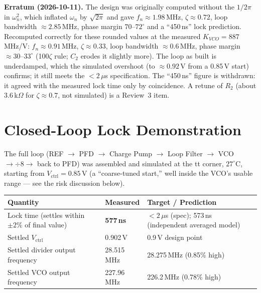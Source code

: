 \documentclass[11pt]{article}
\begin{document}
\medskip
\noindent\textbf{Erratum (2026-10-11).} The design was originally computed without the $1/2\pi$ in $\omega_n^2$, which inflated $\omega_n$ by $\sqrt{2\pi}$ and gave $f_n \approx 1.98$\,MHz, $\zeta \approx 0.72$, loop bandwidth $\approx 2.85$\,MHz, phase margin $70$--$72^\circ$ and a ``450\,ns'' lock prediction. Recomputed correctly for these rounded values at the measured $K_{VCO} = 887$\,MHz/V: $f_n \approx 0.91$\,MHz, $\zeta \approx 0.33$, loop bandwidth $\approx 0.6$\,MHz, phase margin $\approx 30$--$33^\circ$ (100$\zeta$ rule; $C_2$ erodes it slightly more). The loop as built is underdamped, which the simulated overshoot (to $\approx 0.92$\,V from a 0.85\,V start) confirms; it still meets the $<2\,\mu$s specification. The ``450\,ns'' figure is withdrawn: it agreed with the measured lock time only by coincidence. A retune of $R_2$ (about $3.6$\,k$\Omega$ for $\zeta \approx 0.7$, not simulated) is a Review~3 item.

\section{Closed-Loop Lock Demonstration}
\label{sec:closedloop}

The full loop (REF $\to$ PFD $\to$ Charge Pump $\to$ Loop Filter $\to$ VCO $\to \div8 \to$ back to PFD) was assembled and simulated at the tt corner, $27^\circ$C, starting from $V_{\text{ctrl}} = 0.85$\,V (a ``coarse-tuned start,'' well inside the VCO's usable range --- see the risk discussion below).

\begin{table}[h]
\centering
\small
\begin{tabular}{p{6cm}p{2.6cm}p{5.8cm}}
\toprule
\textbf{Quantity} & \textbf{Measured} & \textbf{Target / Prediction} \\
\midrule
Lock time (settles within $\pm2\%$ of final value) & \textbf{577\,ns} & $<2\,\mu$s (spec); 573\,ns (independent averaged model) \\
Settled $V_{\text{ctrl}}$ & 0.902\,V & 0.9\,V design point \\
Settled divider output frequency & 28.515\,MHz & 28.275\,MHz (0.85\% high) \\
Settled VCO output frequency & 227.96\,MHz & 226.2\,MHz (0.78\% high) \\
\bottomrule
\end{tabular}
\end{table}
\end{document}
